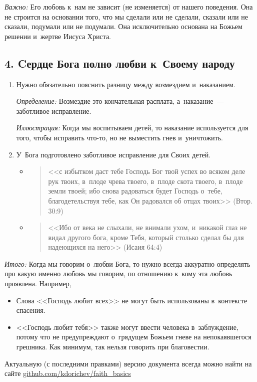 \documentclass[a4paper,12pt]{article}
\begin{document}
\noindent \emph{Важно:} Его любовь к~нам не зависит (не изменяется) от нашего поведения. Она не строится на основании того, что мы сделали или не сделали, сказали или не сказали, подумали или не подумали. Она исключительно основана на Божьем решении и~жертве Иисуса Христа.

\subsection{4. Cердце Бога полно любви к~Своему народу}

\begin{enumerate}
    \item Нужно обязательно пояснить разницу между возмездием и~наказанием. 
    
    \emph{Определение:} Возмездие это кончательная расплата, а~наказание~--- заботливое исправление.

    \emph{Иллюстрация:} Когда мы воспитываем детей, то наказание используется для того, чтобы исправить что-то, но не выместить гнев и~уничтожить.

    \item У~Бога подготовлено заботливое исправление для Своих детей. 
    \begin{itemize}
        \item 
        \begin{quote}
        <<с избытком даст тебе Господь Бог твой успех во всяком деле рук твоих, в~плоде чрева твоего, в~плоде скота твоего, в~плоде земли твоей; ибо снова радоваться будет Господь о~тебе, благодетельствуя тебе, как Он радовался об отцах твоих>> (Втор. 30:9) 
        \end{quote}
        \item 
        \begin{quote}
        <<Ибо от века не слыхали, не внимали ухом, и~никакой глаз не видал другого бога, кроме Тебя, который столько сделал бы для надеющихся на него>> (Исаия 64:4)
        \end{quote}
    \end{itemize}
\end{enumerate}

\noindent \emph{Итого:} Когда мы говорим о~любви Бога, то нужно всегда аккуратно определять про какую именно любовь мы говорим, по отношению к~кому эта любовь проявлена. Например, 
\begin{itemize}
    \item Слова <<Господь любит всех>> не могут быть использованы в~контексте спасения. 
    \item <<Господь любит тебя>> также могут ввести человека в~заблуждение, потому что не предупреждают о~грядущем Божьем гневе на непокаявшегося грешника. Как минимум, так нельзя говорить при благовестии.
\end{itemize}

\vfill
\tiny{Актуальную (с последними правками) версию документа всегда можно найти на сайте \href{https://github.com/kdorichev/faith_basics/blob/main/God/lesson_3.6.pdf}{github.com/kdorichev/faith\_basics}}
\end{document}
